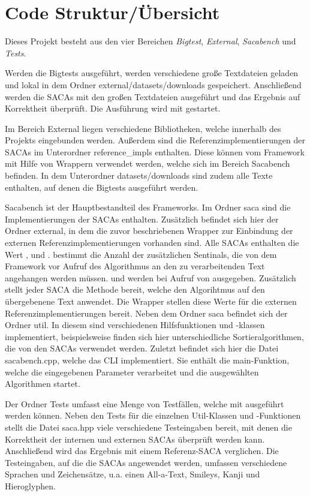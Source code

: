 \section{Code Struktur/Übersicht}
\label{sec:code-structure}
Dieses  Projekt besteht aus den vier Bereichen \textit{Bigtest}, \textit{External}, \textit{Sacabench} und \textit{Tests}. \par
Werden die Bigtests ausgef{\"u}hrt, werden verschiedene gro{\ss}e Textdateien geladen und lokal in dem Ordner external/datasets/downloads gespeichert. 
Anschlie{\ss}end werden die SACAs mit den gro{\ss}en Textdateien ausgef{\"u}hrt und das Ergebnis auf Korrektheit {\"u}berpr{\"u}ft. 
Die Ausf{\"u}hrung wird mit  gestartet. \par
Im Bereich External liegen verschiedene Bibliotheken, welche innerhalb des Projekts eingebunden werden.
Au{\ss}erdem sind die Referenzimplementierungen der SACAs im Unterordner reference\_impls enthalten. 
Diese k{\"o}nnen vom Framework mit Hilfe von Wrappern verwendet werden, welche sich im Bereich Sacabench befinden.
In dem Unterordner datasets/downloads sind zudem alle Texte enthalten, auf denen die Bigtests ausgef{\"u}hrt werden. \par
Sacabench ist der Hauptbestandteil des Frameworks. 
Im Ordner saca sind die Implementierungen der SACAs enthalten. 
Zus{\"a}tzlich befindet sich hier der Ordner external, in dem die zuvor beschriebenen Wrapper zur Einbindung der externen Referenzimplementierungen vorhanden sind. 
Alle SACAs enthalten die Wert ,  und . 
 bestimmt die Anzahl der zus{\"a}tzlichen Sentinals, die von dem Framework vor Aufruf des Algorithmus an den zu verarbeitenden Text angehangen werden m{\"u}ssen. 
 und  werden bei Aufruf von  ausgegeben. 
Zus{\"a}tzlich stellt jeder SACA die Methode  bereit, welche den Algorihtmus auf den {\"u}bergebenene Text anwendet. 
Die Wrapper stellen diese Werte f{\"u}r die externen Referenzimplementierungen bereit.
Neben dem Ordner saca befindet sich der Ordner util. 
In diesem sind verschiedenen Hilfsfunktionen und -klassen implementiert, beispielsweise finden sich hier unterschiedliche Sortieralgorithmen, die von den SACAs verwendet werden. 
Zuletzt befindet sich hier die Datei sacabench.cpp, welche das CLI implementiert. 
Sie enth{\"a}lt die main-Funktion, welche die eingegebenen Parameter verarbeitet und die ausgew{\"a}hlten Algorithmen startet.\par
Der Ordner Tests umfasst eine Menge von Testf{\"a}llen, welche mit  ausgef{\"u}hrt werden k{\"o}nnen. 
Neben den Tests f{\"u}r die einzelnen Util-Klassen und -Funktionen stellt die Datei saca.hpp viele verschiedene Testeingaben bereit, mit denen die Korrektheit der internen und externen SACAs {\"u}berpr{\"u}ft werden kann. 
Anschlie{\ss}end wird das Ergebnis mit einem Referenz-SACA verglichen. 
Die Testeingaben, auf die die SACAs angewendet werden, umfassen verschiedene Sprachen und Zeichens{\"a}tze, u.a. einen All-a-Text, Smileys, Kanji und Hieroglyphen.\par

